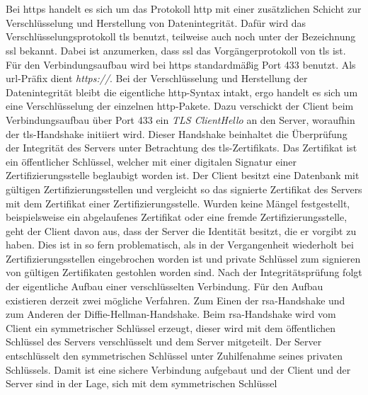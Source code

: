 \documentclass[titlepage]{report}
\begin{document}
\section*{}
Bei \gls{https} handelt es sich um das Protokoll \gls{http} mit einer
zusätzlichen Schicht zur Verschlüsselung und Herstellung von
Datenintegrität. Dafür wird das Verschlüsselungsprotokoll \gls{tls}
benutzt, teilweise auch noch unter der Bezeichnung \gls{ssl} bekannt.
Dabei ist anzumerken, dass \gls{ssl} das Vorgängerprotokoll von
\gls{tls} ist.
Für den Verbindungsaufbau wird bei \gls{https} standardmäßig
Port 433 benutzt\cite[Siehe Section 2.3]{RFC2818}. Als
\gls{url}\hyp{}Präfix dient \emph{https://}. Bei der Verschlüsselung und
Herstellung der Datenintegrität bleibt die eigentliche
\gls{http}\hyp{}Syntax intakt, ergo handelt es sich um eine Verschlüsselung der
einzelnen \gls{http}\hyp{}Pakete. Dazu verschickt der Client beim
Verbindungsaufbau über Port 433 ein \emph{TLS ClientHello} an den
Server, woraufhin der \gls{tls}\hyp{}Handshake initiiert wird.
Dieser Handshake beinhaltet die Überprüfung der Integrität des Servers
unter Betrachtung des \gls{tls}\hyp{}Zertifikats. Das Zertifikat ist
ein öffentlicher Schlüssel, welcher mit einer
digitalen Signatur einer Zertifizierungsstelle beglaubigt worden ist.
Der Client besitzt eine Datenbank mit gültigen Zertifizierungsstellen
und vergleicht so das signierte Zertifikat des Servers mit dem
Zertifikat einer Zertifizierungsstelle. Wurden keine Mängel
festgestellt, beispielsweise ein abgelaufenes Zertifikat oder eine
fremde Zertifizierungsstelle, geht der Client davon aus, dass der Server
die Identität besitzt, die er vorgibt zu haben. Dies ist in so fern
problematisch, als in der Vergangenheit wiederholt bei
Zertifizierungsstellen eingebrochen worden ist und private Schlüssel zum
signieren von gültigen Zertifikaten gestohlen worden
sind\cite{PRIVATEKEYSSTOLEN}. Nach der Integritätsprüfung folgt der
eigentliche Aufbau einer verschlüsselten Verbindung. Für den Aufbau
existieren derzeit zwei mögliche Verfahren. Zum Einen der
\gls{rsa}\hyp{}Handshake und zum Anderen der
Diffie\hyp{}Hellman\hyp{}Handshake\cite{TLS}. Beim
\gls{rsa}\hyp{}Handshake wird vom Client ein symmetrischer Schlüssel
erzeugt, dieser wird mit dem öffentlichen Schlüssel des Servers
verschlüsselt und dem Server mitgeteilt. Der Server entschlüsselt den
symmetrischen Schlüssel unter Zuhilfenahme seines privaten Schlüssels.
Damit ist eine sichere Verbindung aufgebaut und der Client und der Server
sind in der Lage, sich mit dem symmetrischen Schlüssel
\end{document}
